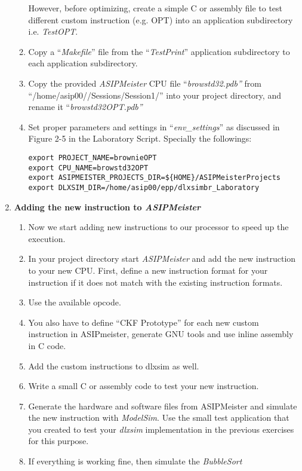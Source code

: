 \begin{enumerate}
\begin{enumerate}
		However, before optimizing, create a simple C or assembly file to
		test different custom instruction (e.g. OPT) into an application
		subdirectory i.e. \emph{TestOPT}.
		\item
		Copy a ``\emph{Makefile}'' file from the ``\emph{TestPrint}''
		application subdirectory to each application subdirectory.
		\item
		Copy the provided \emph{ASIPMeister} CPU file
		``\emph{browstd32.pdb''} from ``/home/asip00//Sessions/Session1/''
		into your project directory, and rename it
		``\emph{browstd32OPT.pdb''}
		\item
		Set proper parameters and settings in ``\emph{env\_settings}'' as
		discussed in Figure 2-5 in the Laboratory Script. Specially the
		followings:
\begin{lstlisting}
export PROJECT_NAME=brownieOPT
export CPU_NAME=browstd32OPT
export ASIPMEISTER_PROJECTS_DIR=${HOME}/ASIPMeisterProjects
export DLXSIM_DIR=/home/asip00/epp/dlxsimbr_Laboratory
\end{lstlisting}
	\end{enumerate}
\item \textbf{Adding the new instruction to \emph{ASIPMeister}}
	\begin{enumerate}
		\def\labelenumii{\arabic{enumii}.}
		\item
		Now we start adding new instructions to our processor to speed up
		the execution.
		\item
		In your project directory start \emph{ASIPMeister} and add the new
		instruction to your new CPU. First, define a new instruction format
		for your instruction if it does not match with the existing
		instruction formats.
		\item
		Use the available opcode.
		\item
		You also have to define ``CKF Prototype'' for each new custom instruction in ASIPmeister, generate GNU tools and use inline assembly in C code.
		\item
		Add the custom instructions to dlxsim as well.
		\item
		Write a small C or assembly code to test your new instruction.
		\item
		Generate the hardware and software files from ASIPMeister and
		simulate the new instruction with \emph{ModelSim}. Use the small
		test application that you created to test your \emph{dlxsim}
		implementation in the previous exercises for this purpose.
		\item
		If everything is working fine, then simulate the \emph{BubbleSort}

\end{enumerate}
\end{enumerate}
